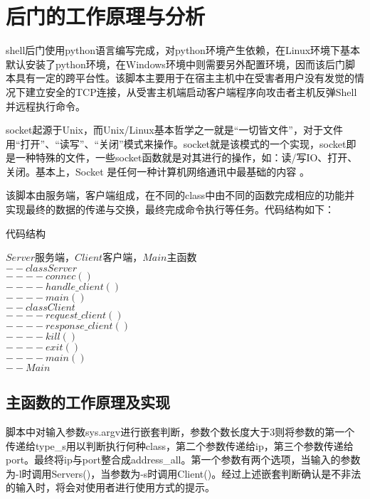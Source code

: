 \chapter{后门的工作原理与分析}
shell后门使用python语言编写完成，对python环境产生依赖，在Linux环境下基本默认安装了python环境，在Windows环境中则需要另外配置环境，因而该后门脚本具有一定的跨平台性。该脚本主要用于在宿主主机中在受害者用户没有发觉的情况下建立安全的TCP连接，从受害主机端启动客户端程序向攻击者主机反弹Shell并远程执行命令。

socket起源于Unix，而Unix/Linux基本哲学之一就是“一切皆文件”，对于文件用“打开”、“读写”、“关闭”模式来操作。socket就是该模式的一个实现，socket即是一种特殊的文件，一些socket函数就是对其进行的操作，如：读/写IO、打开、关闭。基本上，Socket 是任何一种计算机网络通讯中最基础的内容\cite{8} 。

该脚本由服务端，客户端组成，在不同的class中由不同的函数完成相应的功能并实现最终的数据的传递与交换，最终完成命令执行等任务。代码结构如下：



\begin{breakablealgorithm}
        \caption{代码结构}  
        \begin{algorithmic}[1] %
         \Require $Server$服务端，$Client$客户端，$Main$主函数\\
			$--class Server$\\  
				$----connec()$\\
				$----handle\_client()$\\
				$----main()$\\
			$--class Client$\\
				$----request\_client()$\\
				$----response\_client()$\\
				$----kill()$\\
				$----exit()$\\
				$----main()$\\
			$--Main $          
        \end{algorithmic}  
\end{breakablealgorithm}  


\section{主函数的工作原理及实现}
脚本中对输入参数sys.argv进行嵌套判断，参数个数长度大于3则将参数的第一个传递给type\_s用以判断执行何种class，第二个参数传递给ip，第三个参数传递给port。最终将ip与port整合成address\_all。第一个参数有两个选项，当输入的参数为-l时调用Servers()，当参数为-s时调用Client()。经过上述嵌套判断确认是不非法的输入时，将会对使用者进行使用方式的提示。

